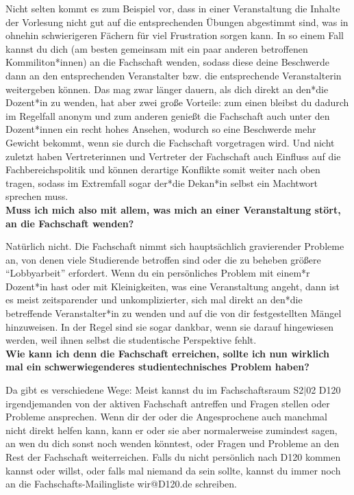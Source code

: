 {    Nicht selten kommt es zum Beispiel vor, dass in einer Veranstaltung die Inhalte der Vorlesung nicht gut auf die entsprechenden Übungen abgestimmt sind, was in ohnehin schwierigeren Fächern für viel Frustration sorgen kann. In so einem Fall kannst du dich (am besten gemeinsam mit ein paar anderen betroffenen Kommiliton*innen) an die Fachschaft wenden, sodass diese deine Beschwerde dann an den entsprechenden Veranstalter bzw. die entsprechende Veranstalterin weitergeben können. Das mag zwar länger dauern, als dich direkt an den*die Dozent*in zu wenden, hat aber zwei große Vorteile: zum einen bleibst du dadurch im Regelfall anonym und zum anderen genießt die Fachschaft auch unter den Dozent*innen ein recht hohes Ansehen, wodurch so eine Beschwerde mehr Gewicht bekommt, wenn sie durch die Fachschaft vorgetragen wird. Und nicht zuletzt haben Vertreterinnen und Vertreter der Fachschaft auch Einfluss auf die Fachbereichspolitik und können derartige Konflikte somit weiter nach oben tragen, sodass im Extremfall sogar der*die Dekan*in selbst ein Machtwort sprechen muss.\\

    \textbf{Muss ich mich also mit allem, was mich an einer Veranstaltung stört, an die Fachschaft wenden?}

    Natürlich nicht. Die Fachschaft nimmt sich hauptsächlich gravierender Probleme an, von denen viele Studierende betroffen sind oder die zu beheben größere "`Lobbyarbeit"' erfordert. Wenn du ein persönliches Problem mit einem*r Dozent*in hast oder mit Kleinigkeiten, was eine Veranstaltung angeht, dann ist es meist zeitsparender und unkomplizierter, sich mal direkt an den*die betreffende Veranstalter*in zu wenden und auf die von dir festgestellten Mängel hinzuweisen. In der Regel sind sie sogar dankbar, wenn sie darauf hingewiesen werden, weil ihnen selbst die studentische Perspektive fehlt.\\

    \textbf{Wie kann ich denn die Fachschaft erreichen, sollte ich nun wirklich mal ein schwerwiegenderes studientechnisches Problem haben?}

    Da gibt es verschiedene Wege: Meist kannst du im Fachschaftsraum S2$|$02 D120 irgendjemanden von der aktiven Fachschaft antreffen und Fragen stellen oder Probleme ansprechen. Wenn dir der oder die Angesprochene auch manchmal nicht direkt helfen kann, kann er oder sie aber normalerweise zumindest sagen, an wen du dich sonst noch wenden könntest, oder Fragen und Probleme an den Rest der Fachschaft weiterreichen. Falls du nicht persönlich nach D120 kommen kannst oder willst, oder falls mal niemand da sein sollte, kannst du immer noch an die Fachschafts-Mailingliste wir@D120.de schreiben.\\

}
